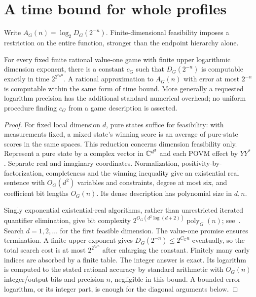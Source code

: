 \section{A time bound for whole profiles}\label{sec:profile-time}
Write $A_G(n)=\log_2D_G(2^{-n})$. Finite-dimensional feasibility imposes a restriction on the entire function, stronger than the endpoint hierarchy alone.

\begin{proposition}\label{prop:profile-time}
For every fixed finite rational value-one game with finite upper logarithmic dimension exponent, there is a constant $c_G$ such that $D_G(2^{-n})$ is computable exactly in time $2^{2^{c_Gn}}$. A rational approximation to $A_G(n)$ with error at most $2^{-n}$ is computable within the same form of time bound. More generally a requested logarithm precision has the additional standard numerical overhead; no uniform procedure finding $c_G$ from a game description is asserted.
\end{proposition}
\begin{proof}
For fixed local dimension $d$, pure states suffice for feasibility: with measurements fixed, a mixed state's winning score is an average of pure-state scores in the same spaces. This reduction concerns dimension feasibility only. Represent a pure state by a complex vector in $\mathbb C^{d^2}$ and each POVM effect by $YY^*$. Separate real and imaginary coordinates. Normalization, positivity-by-factorization, completeness and the winning inequality give an existential real sentence with $O_G(d^2)$ variables and constraints, degree at most six, and coefficient bit lengths $O_G(n)$. Its dense description has polynomial size in $d,n$.

Singly exponential existential-real algorithms, rather than unrestricted iterated quantifier elimination, give bit complexity $2^{O_G(d^2\log(d+2))}\operatorname{poly}_G(n)$; see~\cite[Sections~2.2 and~2.5]{Basu14}. Search $d=1,2,\ldots$ for the first feasible dimension. The value-one promise ensures termination. A finite upper exponent gives $D_G(2^{-n})\le2^{C_Gn}$ eventually, so the total search cost is at most $2^{2^{c_Gn}}$ after enlarging the constant. Finitely many early indices are absorbed by a finite table. The integer answer is exact. Its logarithm is computed to the stated rational accuracy by standard arithmetic with $O_G(n)$ integer/output bits and precision $n$, negligible in this bound. A bounded-error logarithm, or its integer part, is enough for the diagonal arguments below.
\end{proof}

